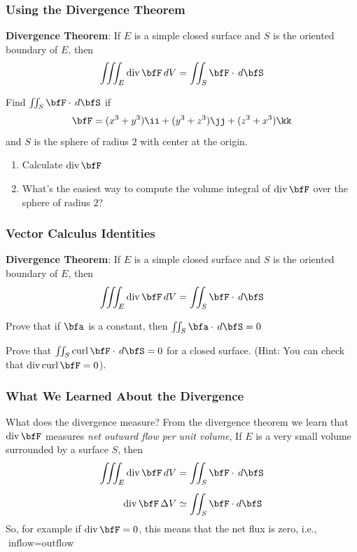 \documentclass[notes=show,10pt]{beamer}
\begin{document}
\begin{frame}
\frametitle{Using the Divergence Theorem}
\footnotesize
\textbf{Divergence Theorem}: If $E$ is a simple closed surface and $S$ is the oriented boundary of $E$, then
$$ \iiint_E {\mathrm{div}} \,\bfF \, dV = \iint_S \bfF \cdot \, d \bfS $$

\vfill

Find $\iint_S \bfF \cdot \, d\bfS$ if 
$$ \bfF = (x^3+y^3) \ii + (y^3 + z^3) \jj + (z^3 + x^3) \kk $$
and $S$ is the sphere of radius $2$ with center at the origin.

\vfill

\begin{enumerate}
\item	Calculate ${\mathrm{div}}\, \bfF$
\medskip

\item	What's the easiest way to compute the volume integral of ${\mathrm{div}}\, \bfF$ over the sphere of radius $2$?
\end{enumerate}
\end{frame}

\begin{frame}
\frametitle{Vector Calculus Identities}
\footnotesize
\textbf{Divergence Theorem}: If $E$ is a simple closed surface and $S$ is the oriented boundary of $E$, then
$$ \iiint_E {\mathrm{div}} \,\bfF \, dV = \iint_S \bfF \cdot \, d \bfS $$

\vfill

Prove that if $\bfa$ is a constant, then
$\iint_S \bfa \cdot \, d\bfS = 0$

\vfill
Prove that $\iint_S {\mathrm{curl}}\, \bfF \cdot \, d\bfS = 0$ for a closed surface. 
(Hint: You can check that ${\mathrm{div}} \, {\mathrm{curl}}\,  \bfF = 0$).


\end{frame}

\begin{frame}
\frametitle{What We Learned About the Divergence}
\footnotesize
What does the divergence measure?  From the divergence theorem we learn
that ${\mathrm{div}}\, \bfF$ measures \emph{net outward flow per unit volume}, If 
$E$ is a very small volume surrounded by a surface $S$, then
\begin{align*}
\iiint_E {\mathrm{div}} \, \bfF \, dV 	&=	\iint_S \bfF \cdot \, d\bfS	\\[5pt]
{\mathrm{div}} \, \bfF \, \Delta V		&\simeq \iint_S \bfF \cdot d \bfS 
\end{align*}
So, for example if ${\mathrm{div}} \, \bfF = 0$, this means that the net flux is zero, i.e., $\text{inflow}  = \text{outflow}$
\end{frame}
\end{document}
